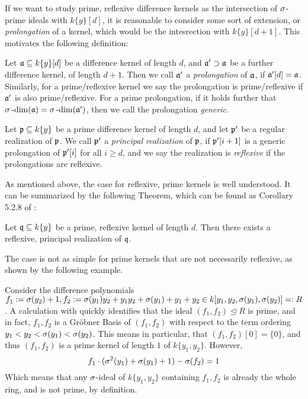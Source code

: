 If we want to study prime, reflexive difference kernels as the intersection of $\sigma$-prime ideals with $k\{y\}[d]$,
it is reasonable to consider some sort of extension, or \emph{prolongation} of a kernel, which would be the intesrection with $k\{y\}[d+1]$.  
This motivates the following definition: 

\begin{defn}
Let $\mathfrak{a} \subseteq k\{y\}[d]$ be a difference kernel of length $d$, and $\mathfrak{a}' \supset \mathfrak{a}$ be a further difference kernel, of length $d+1$.
Then we call $\mathfrak{a}'$ a \emph{prolongation} of $\mathfrak{a}$, if $\mathfrak{a}'[d] = \mathfrak{a}$. Similarly, for a prime/reflexive kernel we say the prolongation is prime/reflexive if $\mathfrak{a}'$ is also prime/reflexive.
For a prime prolongation, if it holds further that $\sigma\operatorname{-dim}(\mathfrak{a}) = \sigma\operatorname{-dim}(\mathfrak{a}')$, then we call the prolongation \emph{generic}.
\end{defn}

\begin{defn}
Let $\mathfrak{p} \subseteq k\{y\}$ be a prime difference kernel of length $d$, and let $\mathfrak{p}'$ be a regular realization of $\mathfrak{p}$. We call $\mathfrak{p}'$ a \emph{principal realization} of $\mathfrak{p}$, if $\mathfrak{p}'[i+1]$ is a generic prolongation of $\mathfrak{p}'[i]$ for all $i \geq d$,
and we say the realization is \emph{reflexive} if the prolongations are reflexive.  
\end{defn}

As mentioned above, the case for reflexive, prime kernels is well understood. It can be summarized by the following Theorem, which can be found as Corollary 5.2.8 of \cite{wibmer}:
\begin{theorem}
Let $\mathfrak{q} \subseteq k\{y\}$ be a prime, reflexive kernel of length $d$. Then there exists a reflexive, principal realization of $\mathfrak{q}$. 
\end{theorem}

The case is not as simple for prime kernels that are not necessarily reflexive, as shown by the following example.

\begin{ex}\label{counterexker}
Consider the difference polynomials $f_1 := \sigma(y_2) + 1, f_2:= \sigma(y_1)y_2 + y_1y_2 + \sigma(y_1) + y_1 + y_2 \in k[y_1,y_2,\sigma(y_1),\sigma(y_2)] =: R$.
A calculation with \cite{M2} quickly identifies that the ideal $(f_1,f_2) \unlhd R$ is prime, and in fact, $f_1,f_2$ is a Gr\"{o}bner Basis of $(f_1,f_2)$ with respect to the
term ordering $y_1 < y_2 < \sigma(y_1) < \sigma(y_2)$. This means in particular, that $(f_1,f_2)[0] = \{0\}$, and thus $(f_1,f_2)$ is a prime kernel of length $1$ of $k\{y_1,y_2\}$. However,
\[ f_1 \cdot (\sigma^2(y_1) + \sigma(y_1) + 1 ) - \sigma(f_2) = 1 \]
Which means that any $\sigma$-ideal of $k\{y_1,y_2\}$ containing $f_1, f_2$ is already the whole ring, and is not prime, by definition.
\end{ex}

